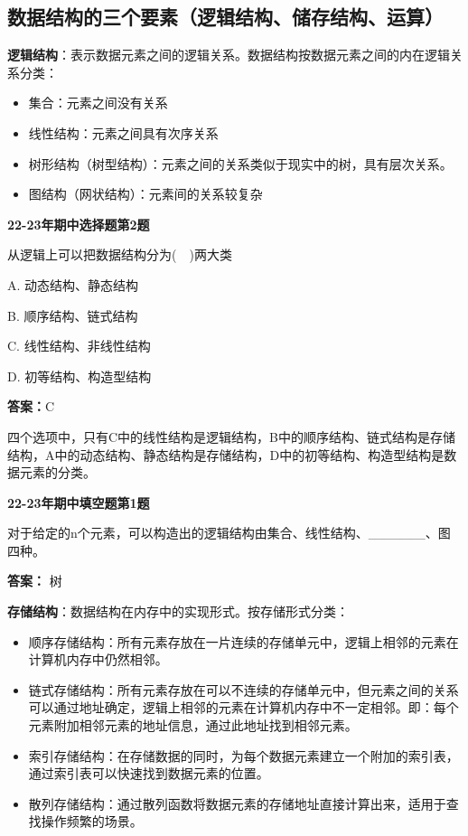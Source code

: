 \documentclass[a4paper]{ltxdoc}
\begin{document}
\subsection{数据结构的三个要素（逻辑结构、储存结构、运算）}
\par \textbf{逻辑结构}：表示数据元素之间的逻辑关系。数据结构按数据元素之间的内在逻辑关系分类：
\begin{itemize}
    \item 集合：元素之间没有关系
    \item 线性结构：元素之间具有次序关系
    \item 树形结构（树型结构）：元素之间的关系类似于现实中的树，具有层次关系。
    \item 图结构（网状结构）：元素间的关系较复杂
\end{itemize}
\begin{framed}
    \textbf{22-23年期中选择题第2题}
    \par 从逻辑上可以把数据结构分为(\ \ )两大类
    \par A. 动态结构、静态结构
    \par B. 顺序结构、链式结构
    \par C. 线性结构、非线性结构
    \par D. 初等结构、构造型结构
    \par \textbf{答案：}C
    \par 四个选项中，只有C中的线性结构是逻辑结构，B中的顺序结构、链式结构是存储结构，A中的动态结构、静态结构是存储结构，D中的初等结构、构造型结构是数据元素的分类。
\end{framed}
\begin{framed}
    \textbf{22-23年期中填空题第1题}
    \par 对于给定的n个元素，可以构造出的逻辑结构由集合、线性结构、\_\_\_\_\_\_、图四种。
    \par \textbf{答案：} 树
\end{framed}
\par \textbf{存储结构}：数据结构在内存中的实现形式。按存储形式分类：
\begin{itemize}
    \item 顺序存储结构：所有元素存放在一片连续的存储单元中，逻辑上相邻的元素在计算机内存中仍然相邻。
    \item 链式存储结构：所有元素存放在可以不连续的存储单元中，但元素之间的关系可以通过地址确定，逻辑上相邻的元素在计算机内存中不一定相邻。即：每个元素附加相邻元素的地址信息，通过此地址找到相邻元素。
    \item 索引存储结构：在存储数据的同时，为每个数据元素建立一个附加的索引表，通过索引表可以快速找到数据元素的位置。
    \item 散列存储结构：通过散列函数将数据元素的存储地址直接计算出来，适用于查找操作频繁的场景。
\end{itemize}
\end{document}
